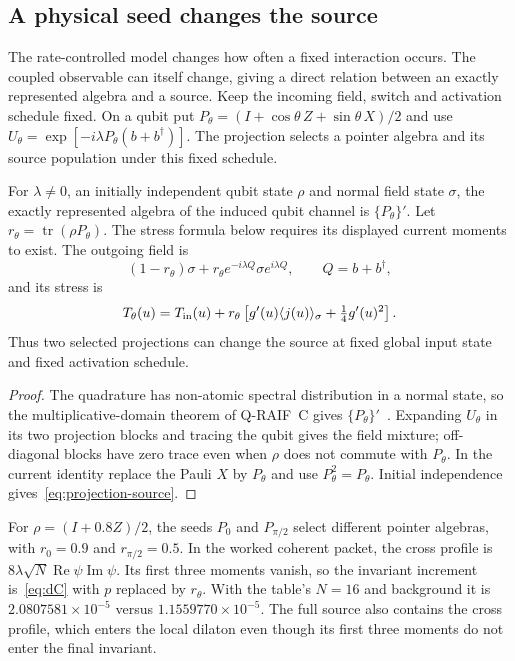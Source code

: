 \subsection{A physical seed changes the source}
\label{sec:projection-source}

The rate-controlled model changes how often a fixed interaction occurs. The coupled
observable can itself change, giving a direct relation between an exactly represented
algebra and a source. Keep the incoming field, switch and activation schedule fixed.
On a qubit put $P_\theta=(I+\cos\theta\,Z+\sin\theta\,X)/2$ and use
$U_\theta=\exp[-i\lambda P_\theta(b+b^\dagger)]$. The projection selects a pointer
algebra and its source population under this fixed schedule.

\begin{proposition}\label{prop:projection-source}
For $\lambda\ne0$, an initially independent qubit state $\rho$ and normal field state $\sigma$, the
exactly represented algebra of the induced qubit channel is $\{P_\theta\}'$. Let
$r_\theta=\operatorname{tr}(\rho P_\theta)$. The stress formula below requires its displayed current moments to exist. The outgoing field is
\[
 (1-r_\theta)\sigma+r_\theta e^{-i\lambda Q}\sigma e^{i\lambda Q},\qquad Q=b+b^\dagger,
\]
and its stress is
\begin{equation}
 T_\theta(u)=T_{\rm in}(u)+r_\theta
 \left[g'(u)\langle j(u)\rangle_\sigma+\tfrac14g'(u)^2\right].
\label{eq:projection-source}
\end{equation}
Thus two selected projections can change the source at fixed global input state and
fixed activation schedule.
\end{proposition}
\begin{proof}
The quadrature has non-atomic spectral distribution in a normal state, so the
multiplicative-domain theorem of Q-RAIF~C gives $\{P_\theta\}'$~\cite{QRC}.
Expanding $U_\theta$ in its two projection blocks and tracing the qubit gives the
field mixture; off-diagonal blocks have zero trace even when $\rho$ does not commute
with $P_\theta$. In the current identity replace the Pauli $X$ by $P_\theta$ and
use $P_\theta^2=P_\theta$. Initial independence gives~\eqref{eq:projection-source}.
\end{proof}

For $\rho=(I+0.8Z)/2$, the seeds $P_0$ and $P_{\pi/2}$ select different pointer
algebras, with $r_0=0.9$ and $r_{\pi/2}=0.5$. In the worked coherent packet,
the cross profile is $8\lambda\sqrt N\operatorname{Re}\psi\operatorname{Im}\psi$.
Its first three moments vanish, so the invariant increment is~\eqref{eq:dC} with
$p$ replaced by $r_\theta$. With the table's $N=16$ and background it is
$2.0807581\times10^{-5}$ versus $1.1559770\times10^{-5}$. The full source also
contains the cross profile, which enters the local dilaton even though its first
three moments do not enter the final invariant.

